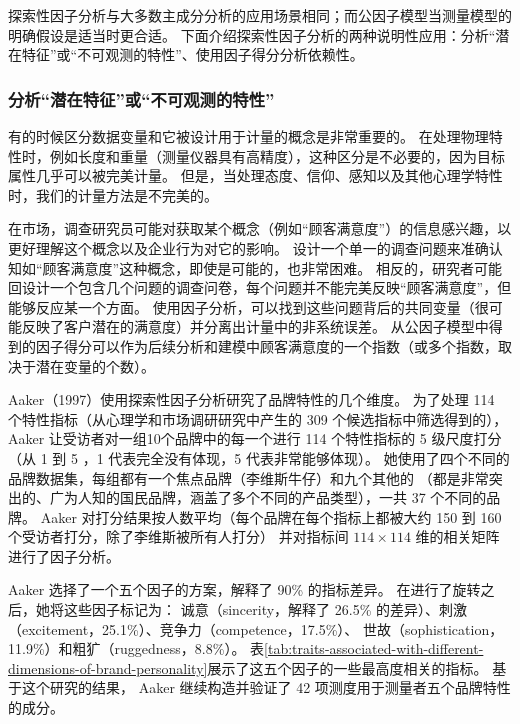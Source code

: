 探索性因子分析与大多数主成分分析的应用场景相同；而公因子模型当测量模型的明确假设是适当时更合适。
下面介绍探索性因子分析的两种说明性应用：分析“潜在特征”或“不可观测的特性”、使用因子得分分析依赖性。

\subsubsection{分析“潜在特征”或“不可观测的特性”}

有的时候区分数据变量和它被设计用于计量的概念是非常重要的。
在处理物理特性时，例如长度和重量（测量仪器具有高精度），这种区分是不必要的，因为目标属性几乎可以被完美计量。
但是，当处理态度、信仰、感知以及其他心理学特性时，我们的计量方法是不完美的。

在市场，调查研究员可能对获取某个概念（例如“顾客满意度”）的信息感兴趣，以更好理解这个概念以及企业行为对它的影响。
设计一个单一的调查问题来准确认知如“顾客满意度”这种概念，即使是可能的，也非常困难。
相反的，研究者可能回设计一个包含几个问题的调查问卷，每个问题并不能完美反映“顾客满意度”，但能够反应某一个方面。
使用因子分析，可以找到这些问题背后的共同变量（很可能反映了客户潜在的满意度）并分离出计量中的非系统误差。
从公因子模型中得到的因子得分可以作为后续分析和建模中顾客满意度的一个指数（或多个指数，取决于潜在变量的个数）。

Aaker（1997）使用探索性因子分析研究了品牌特性的几个维度。
为了处理 114 个特性指标（从心理学和市场调研研究中产生的 309 个候选指标中筛选得到的），
Aaker 让受访者对一组10个品牌中的每一个进行 114 个特性指标的 5 级尺度打分（从 1 到 5 ，1 代表完全没有体现，5 代表非常能够体现）。
她使用了四个不同的品牌数据集，每组都有一个焦点品牌（李维斯牛仔）和九个其他的
（都是非常突出的、广为人知的国民品牌，涵盖了多个不同的产品类型），一共 37 个不同的品牌。
Aaker 对打分结果按人数平均（每个品牌在每个指标上都被大约 150 到 160 个受访者打分，除了李维斯被所有人打分）
并对指标间 $ 114 \times 114 $ 维的相关矩阵进行了因子分析。

Aaker 选择了一个五个因子的方案，解释了 90\% 的指标差异。
在进行了旋转之后，她将这些因子标记为：
诚意（sincerity，解释了 26.5\% 的差异）、刺激（excitement，25.1\%）、竞争力（competence，17.5\%）、
世故（sophistication，11.9\%）和粗犷（ruggedness，8.8\%）。
表\ref{tab:traits-associated-with-different-dimensions-of-brand-personality}展示了这五个因子的一些最高度相关的指标。
基于这个研究的结果， Aaker 继续构造并验证了 42 项测度用于测量者五个品牌特性的成分。

